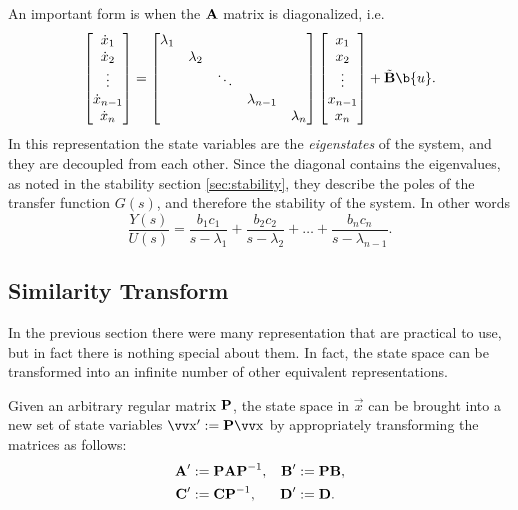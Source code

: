 An important form is when the \(\bm{\mathrm{A}}\) matrix is diagonalized, i.e.
\[
	\begin{bmatrix}
		\dot{x}_1 \\ \dot{x}_2 \\ \vdots \\ \dot{x}_{n-1} \\ \dot{x}_n
	\end{bmatrix}
	=
	\begin{bmatrix}
		\lambda_1 \\
		& \lambda_2 \\
		& & \ddots \\
		& & & \lambda_{n-1} \\
		& & & & \lambda_n
	\end{bmatrix}
	\begin{bmatrix}
		x_1 \\ x_2 \\ \vdots \\ x_{n-1} \\ x_n
	\end{bmatrix}
	+
	\tilde{\mx{B}}\b{u}.
\]
In this representation the state variables are the \emph{eigenstates} of the system, and they are decoupled from each other. Since the diagonal contains the eigenvalues, as noted in the stability section \ref{sec:stability}, they describe the poles of the transfer function \(G(s)\), and therefore the stability of the system. In other words
\[
	\frac{Y(s)}{U(s)} =
	\frac{b_1 c_1}{s - \lambda_1} +
	\frac{b_2 c_2}{s - \lambda_2} + \dots +
	\frac{b_n c_n}{s - \lambda_{n-1}}.
\]


\subsection{Similarity Transform}

In the previous section there were many representation that are practical to use, but in fact there is nothing special about them. In fact, the state space can be transformed into an infinite number of other equivalent representations.

Given an arbitrary regular matrix \(\bm{\mathrm{P}}\), the state space in \(\vec{x}\) can be brought into a new set of state variables \(\vec{x}' := \mx{P} \vec{x}\) by appropriately transforming the matrices as follows:
\begin{align*}
	\bm{\mathrm{A}}' &:= \bm{\mathrm{P}} \bm{\mathrm{A}} \bm{\mathrm{P}}^{-1}, &
	\bm{\mathrm{B}}'	&:= \bm{\mathrm{P}} \bm{\mathrm{B}}, \\
	\bm{\mathrm{C}}' &:= \bm{\mathrm{C}} \bm{\mathrm{P}}^{-1}, &
	\bm{\mathrm{D}}' &:= \bm{\mathrm{D}}.
\end{align*}

